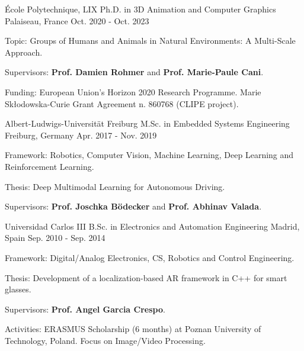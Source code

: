 

\begin{cventries}

  \cventry
    {École Polytechnique, LIX} %
    {Ph.D. in 3D Animation and Computer Graphics} %
    {Palaiseau, France} %
    {Oct. 2020 - Oct. 2023} %
    {
      \begin{cvitems} %
        \item {Topic: Groups of Humans and Animals in Natural Environments: A Multi-Scale Approach.}
        \item {Supervisors: \textbf{Prof. Damien Rohmer} and \textbf{Prof. Marie-Paule Cani}.}
        \item {Funding: European Union’s Horizon 2020 Research Programme. Marie Skłodowska-Curie Grant Agreement n. 860768 (CLIPE project).}
      \end{cvitems}
    }

  \cventry
    {Albert-Ludwigs-Universität Freiburg} %
    {M.Sc. in Embedded Systems Engineering} %
    {Freiburg, Germany} %
    {Apr. 2017 - Nov. 2019} %
    {
      \begin{cvitems} %
        \item {Framework: Robotics, Computer Vision, Machine Learning, Deep Learning and Reinforcement Learning.}
        \item {Thesis: Deep Multimodal Learning for Autonomous Driving.}
        \item {Supervisors: \textbf{Prof. Joschka Bödecker} and \textbf{Prof. Abhinav Valada}.}
      \end{cvitems}
    }

  \cventry
    {Universidad Carlos III} %
    {B.Sc. in Electronics and Automation Engineering} %
    {Madrid, Spain} %
    {Sep. 2010 - Sep. 2014} %
    {
      \begin{cvitems} %
        \item {Framework: Digital/Analog Electronics, CS, Robotics and Control Engineering.}
        \item {Thesis: Development of a localization-based AR framework in C++ for smart glasses.}
        \item {Supervisors: \textbf{Prof. Angel Garcia Crespo}.}
        \item {Activities: ERASMUS Scholarship (6 months) at Poznan University of Technology, Poland. Focus on Image/Video Processing.}
      \end{cvitems}
    }

\end{cventries}
